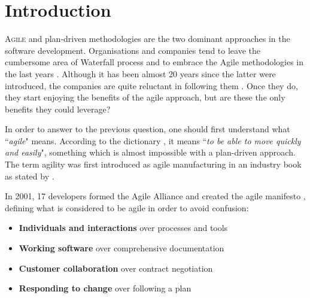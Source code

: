                                                                                      \chapter{Introduction}
\label{ch:introduction}

\lettrine[lines=4, loversize=-0.1, lraise=0.1]{A}{gile} and plan-driven methodologies are the two dominant approaches in the software development. Organisations and companies tend to leave the cumbersome area of Waterfall process and to embrace the Agile methodologies in the last years \cite{laurie_williams, Wang_Conboy, Salo_Abrahamsson}. Although it has been almost 20 years since the latter were introduced, the companies are quite reluctant in following them \cite{4599456}. Once they do, they start enjoying the benefits of the agile approach, but are these the only benefits they could leverage?

In order to answer to the previous question, one should first understand what ``\textit{agile}" means. According to the dictionary \cite{cambridge_dictionary}, it means ``\textit{to be able to move quickly and easily}", something which is almost impossible with a plan-driven approach. The term agility was first introduced as agile manufacturing in an industry book \cite{agile_manufacturing} as stated by \citet{conboy_fitzgerald}.

In 2001, 17 developers formed the Agile Alliance and created the agile manifesto \cite{beck2001agile}, defining what is considered to be agile in order to avoid confusion: 
\begin{itemize}
	\item {\large \textbf{Individuals and interactions}} over processes and tools
	\item {\large \textbf{Working software}} over comprehensive documentation
	\item {\large \textbf{Customer collaboration}} over contract negotiation
	\item {\large \textbf{Responding to change}} over following a plan
\end{itemize}

